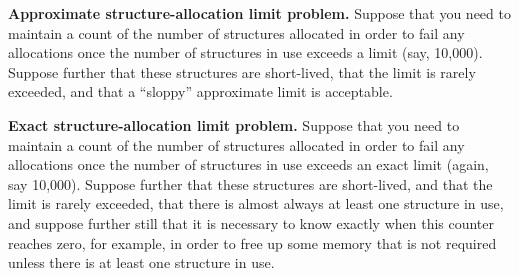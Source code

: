 \edef\QQstatcnt{Quick Quiz \thechapter.\thequickquizctr}

\QuickQuiz{}
	{ \bfseries Approximate structure-allocation limit problem. }
	Suppose that you need to maintain a count of the number of
	structures allocated in order to fail any allocations
	once the number of structures in use exceeds a limit
	(say, 10,000).
	Suppose further that these structures are short-lived,
	that the limit is rarely exceeded, and that a ``sloppy''
	approximate limit is acceptable.
 \QuickQuizEnd

\edef\QQapproxcnt{Quick Quiz \thechapter.\thequickquizctr}

\QuickQuiz{}
	{ \bfseries Exact structure-allocation limit problem. }
	Suppose that you need to maintain a count of the number of
	structures allocated in order to fail any allocations
	once the number of structures in use exceeds an exact limit
	(again, say 10,000).
	Suppose further that these structures are short-lived,
	and that the limit is rarely exceeded, that there is almost
	always at least one structure in use, and suppose further
	still that it is necessary to know exactly when this counter reaches
	zero, for example, in order to free up some memory
	that is not required unless there is at least one structure
	in use.
 \QuickQuizEnd

\edef\QQexactcnt{Quick Quiz \thechapter.\thequickquizctr}

